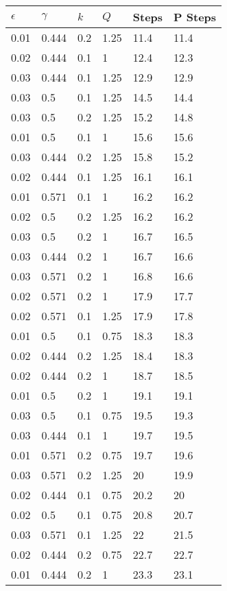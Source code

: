 \documentclass{amsart}
\begin{document}
\begin{center}
	\begin{longtable}{| l | l | l | l || l | l |} \hline
		$\epsilon$	&$\gamma$	&$k$		&$Q$		&Steps	&P Steps \\ \hline
		0.01&	0.444&	0.2&	1.25&	11.4&	11.4 \\ \hline
		0.02&	0.444&	0.1&	1&	12.4&	12.3\\ \hline
		0.03&	0.444&	0.1&	1.25&	12.9&	12.9\\ \hline
		0.03&	0.5&	0.1&	1.25&	14.5&	14.4\\ \hline
		0.03&	0.5&	0.2&	1.25&	15.2&	14.8\\ \hline
		0.01&	0.5&	0.1&	1&	15.6&	15.6\\ \hline
		0.03&	0.444&	0.2&	1.25&	15.8&	15.2\\ \hline
		0.02&	0.444&	0.1&	1.25&	16.1&	16.1\\ \hline
		0.01&	0.571&	0.1&	1&	16.2&	16.2\\ \hline
		0.02&	0.5&	0.2&	1.25&	16.2&	16.2\\ \hline
		0.03&	0.5&	0.2&	1&	16.7&	16.5\\ \hline
		0.03&	0.444&	0.2&	1&	16.7&	16.6\\ \hline
		0.03&	0.571&	0.2&	1&	16.8&	16.6\\ \hline
		0.02&	0.571&	0.2&	1&	17.9&	17.7\\ \hline
		0.02&	0.571&	0.1&	1.25&	17.9&	17.8\\ \hline
		0.01&	0.5&	0.1&	0.75&	18.3&	18.3\\ \hline
		0.02&	0.444&	0.2&	1.25&	18.4&	18.3\\ \hline
		0.02&	0.444&	0.2&	1&	18.7&	18.5\\ \hline
		0.01&	0.5&	0.2&	1&	19.1&	19.1\\ \hline
		0.03&	0.5&	0.1&	0.75&	19.5&	19.3\\ \hline
		0.03&	0.444&	0.1&	1&	19.7&	19.5\\ \hline
		0.01&	0.571&	0.2&	0.75&	19.7&	19.6\\ \hline
		0.03&	0.571&	0.2&	1.25&	20&	19.9\\ \hline
		0.02&	0.444&	0.1&	0.75&	20.2&	20\\ \hline
		0.02&	0.5&	0.1&	0.75&	20.8&	20.7\\ \hline
		0.03&	0.571&	0.1&	1.25&	22&	21.5\\ \hline
		0.02&	0.444&	0.2&	0.75&	22.7&	22.7\\ \hline
		0.01&	0.444&	0.2&	1&	23.3&	23.1\\ \hline

\end{longtable}
\end{center}
\end{document}
